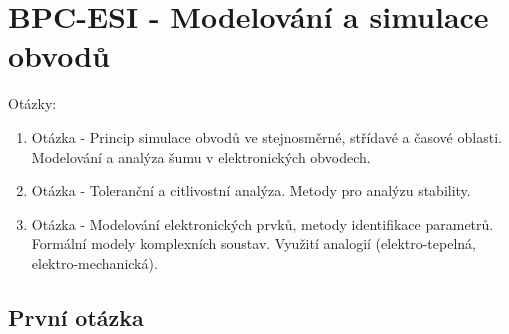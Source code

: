 \part{BPC-ESI - Modelování a simulace obvodů}
{\huge Otázky:}
\newline
\begin{enumerate}
	\item Otázka - Princip simulace obvodů ve stejnosměrné, střídavé a časové oblasti. Modelování a analýza šumu v elektronických obvodech.
	\item Otázka - Toleranční a citlivostní analýza. Metody pro analýzu stability.
	\item Otázka - Modelování elektronických prvků, metody identifikace parametrů. Formální modely komplexních soustav. Využití analogií (elektro-tepelná, elektro-mechanická).
\end{enumerate}
\newpage
\chapter{První otázka}
